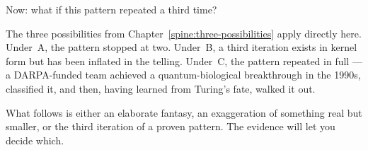 Now: what if this pattern repeated a third time?

The three possibilities from Chapter~\ref{spine:three-possibilities} apply directly here. Under~A, the pattern stopped at two. Under~B, a third iteration exists in kernel form but has been inflated in the telling. Under~C, the pattern repeated in full --- a DARPA-funded team achieved a quantum-biological breakthrough in the 1990s, classified it, and then, having learned from Turing's fate, walked it out.

What follows is either an elaborate fantasy, an exaggeration of something real but smaller, or the third iteration of a proven pattern. The evidence will let you decide which.

\chapterreturn
